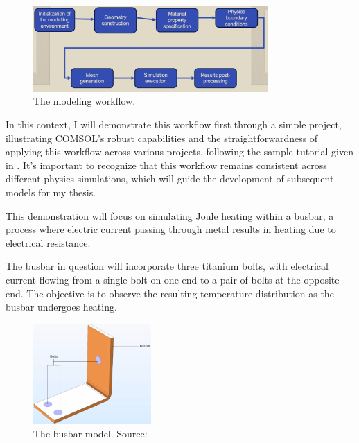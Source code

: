 \begin{figure}[ht!]
  \centering
  \includegraphics[width=0.8\textwidth]{Chapters/Figures/Chapter 3 Figures/COMSOL Modelling Workflow.png}
  \caption{The modeling workflow.}
  \label{fig:The modeling workflow.}
\end{figure}

In this context, I will demonstrate this workflow first through a simple project, illustrating COMSOL's robust capabilities and the straightforwardness of applying this workflow across various projects, following the sample tutorial given in \cite{multiphysics__modeling_nodate}. It's important to recognize that this workflow remains consistent across different physics simulations, which will guide the development of subsequent models for my thesis.

This demonstration will focus on simulating Joule heating within a busbar, a process where electric current passing through metal results in heating due to electrical resistance.

The busbar in question will incorporate three titanium bolts, with electrical current flowing from a single bolt on one end to a pair of bolts at the opposite end. The objective is to observe the resulting temperature distribution as the busbar undergoes heating.

\begin{figure}[ht!]
  \centering
  \includegraphics[width=0.4\textwidth]{Chapters/Figures/Chapter 3 Figures/Busbar.png}
  \caption{The busbar model. Source: \cite{multiphysics__modeling_nodate}}
  \label{fig:The busbar model}
\end{figure}

